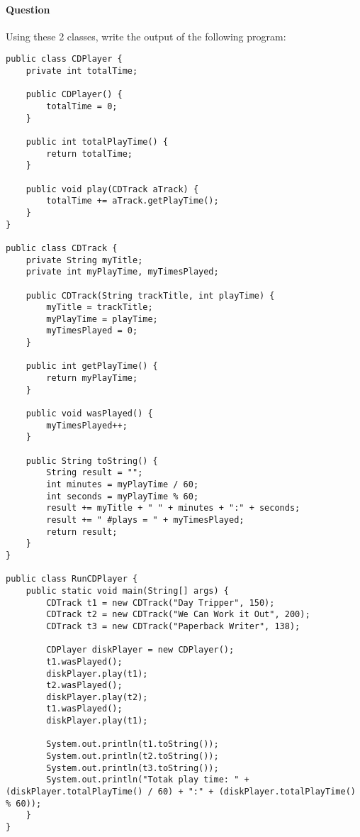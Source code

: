 \documentclass{article}
\begin{document}
\addtocounter{question_num}{1}
\paragraph{Question }
Using these 2 classes, write the output of the following program:
\begin{lstlisting}
public class CDPlayer {
	private int totalTime;

	public CDPlayer() {
		totalTime = 0;
	}

	public int totalPlayTime() {
		return totalTime;
	}

	public void play(CDTrack aTrack) {
		totalTime += aTrack.getPlayTime();
	}
}

public class CDTrack {
	private String myTitle;
	private int myPlayTime, myTimesPlayed;

	public CDTrack(String trackTitle, int playTime) {
		myTitle = trackTitle;
		myPlayTime = playTime;
		myTimesPlayed = 0;
	}

	public int getPlayTime() {
		return myPlayTime;
	}

	public void wasPlayed() {
		myTimesPlayed++;
	}

	public String toString() {
		String result = "";
		int minutes = myPlayTime / 60;
		int seconds = myPlayTime % 60;
		result += myTitle + " " + minutes + ":" + seconds;
		result += " #plays = " + myTimesPlayed;
		return result;
	}
}

public class RunCDPlayer {
	public static void main(String[] args) {
		CDTrack t1 = new CDTrack("Day Tripper", 150);
		CDTrack t2 = new CDTrack("We Can Work it Out", 200);
		CDTrack t3 = new CDTrack("Paperback Writer", 138);

		CDPlayer diskPlayer = new CDPlayer();
		t1.wasPlayed();
		diskPlayer.play(t1);
		t2.wasPlayed();
		diskPlayer.play(t2);
		t1.wasPlayed();
		diskPlayer.play(t1);

		System.out.println(t1.toString());
		System.out.println(t2.toString());
		System.out.println(t3.toString());
		System.out.println("Totak play time: " + (diskPlayer.totalPlayTime() / 60) + ":" + (diskPlayer.totalPlayTime() % 60));
	}
}
\end{lstlisting}
\end{document}
